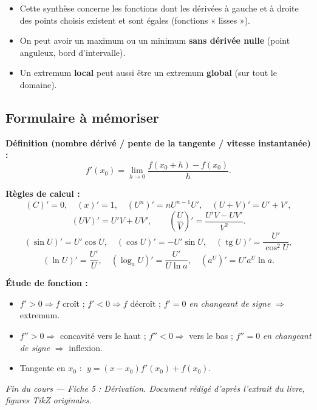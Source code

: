 \documentclass[11pt,a4paper]{article}
\newcommand{\tg}{\operatorname{tg}}
\newcommand{\limh}{\lim_{h\to 0}}
\begin{document}
\begin{remarque}
\begin{itemize}[leftmargin=1.6em,topsep=2pt,itemsep=2pt]
  \item Cette synthèse concerne les fonctions dont les dérivées à gauche et à droite des points
        choisis existent et sont égales (fonctions « lisses »).
  \item On peut avoir un maximum ou un minimum \textbf{sans dérivée nulle} (point anguleux, bord d'intervalle).
  \item Un extremum \textbf{local} peut aussi être un extremum \textbf{global} (sur tout le domaine).
\end{itemize}
\end{remarque}

\subsection{Formulaire à mémoriser}

\begin{tcolorbox}[boxbase,colback=formulacol!5,colframe=formulacol,
    title={\textsc{L'essentiel de la dérivation}}]
\textbf{Définition (nombre dérivé / pente de la tangente / vitesse instantanée) :}
\[
   f'(x_0)=\limh\frac{f(x_0+h)-f(x_0)}{h}.
\]

\smallskip
\textbf{Règles de calcul :}
\[
   (C)'=0,\quad (x)'=1,\quad (U^n)'=nU^{n-1}U',\quad (U+V)'=U'+V',
\]
\[
   (UV)'=U'V+UV',\qquad \left(\frac{U}{V}\right)'=\frac{U'V-UV'}{V^2}.
\]
\[
   (\sin U)'=U'\cos U,\quad (\cos U)'=-U'\sin U,\quad (\tg U)'=\frac{U'}{\cos^2U},
\]
\[
   (\ln U)'=\frac{U'}{U},\quad (\log_a U)'=\frac{U'}{U\ln a},\quad (a^U)'=U'a^U\ln a.
\]

\smallskip
\textbf{Étude de fonction :}
\begin{itemize}[leftmargin=1.5em,topsep=1pt,itemsep=1pt]
  \item $f'>0\Rightarrow f$ croît ; $f'<0\Rightarrow f$ décroît ; $f'=0$ \emph{en changeant de signe} $\Rightarrow$ extremum.
  \item $f''>0\Rightarrow$ concavité vers le haut ; $f''<0\Rightarrow$ vers le bas ; $f''=0$ \emph{en changeant de signe} $\Rightarrow$ inflexion.
  \item Tangente en $x_0$ : $\;y=(x-x_0)f'(x_0)+f(x_0)$.
\end{itemize}
\end{tcolorbox}

\begin{center}
\small\itshape\color{black!55}
Fin du cours — Fiche 5 : Dérivation. Document rédigé d'après l'extrait du livre, figures TikZ originales.
\end{center}
\end{document}
